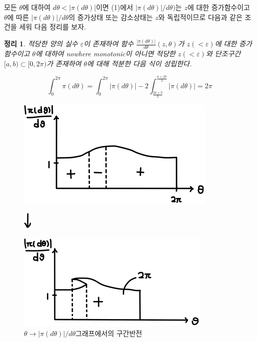 \documentclass[11pt]{article}
\newtheorem{theorem}{정리}
\begin{document}
모든 $\theta$에 대하여 $d\theta<|\pi(d\theta)|$이면 (1)에서 $|\pi(d\theta)|/d\theta)$는 $z$에 대한 증가함수이고 $\theta$에 따른 $|\pi(d\theta)|/d\theta$의 증가상태 또는 감소상태는 $z$와 독립적이므로 다음과 같은 조건을 세워 다음 정리를 보자.


\begin{theorem}
적당한 양의 실수 $\varepsilon$이 존재하여 함수 $\frac{|\pi(d\theta)|}{d\theta}(z,\theta)$가 $z(<\varepsilon)$에 대한 증가함수이고 $\theta$에 대하여 nowhere monotonic이 아니면 적당한 $z(<\varepsilon)$와 단조구간 $[a,b) \subset [0,2\pi)$가 존재하여 $\theta$에 대해 적분한 다음 식이 성립한다.


\begin{equation}
\int_0 ^{2\pi}\pi(d\theta)=\int_0^{2\pi} |\pi(d\theta)|-2\int_{\frac{2a+b}3}^{\frac{a+2b}3}|\pi(d\theta)|=2\pi \nonumber
\end{equation}

\end{theorem}


\begin{figure}
\centering
\includegraphics{10-1.png}
\end{figure}

\begin{figure}
\centering
\includegraphics{10-2.png}
\end{figure}

\begin{figure}
\centering
\includegraphics{10-3.png}
\caption{$\theta \to |\pi(d\theta)|/d\theta$그래프에서의 구간반전}
\end{figure}
\end{document}
